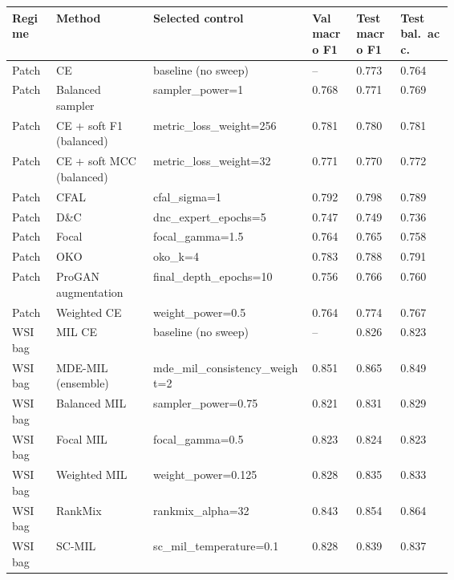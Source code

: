 \begin{tabularx}{\linewidth}{@{}>{\raggedright\arraybackslash}p{0.10\linewidth}>{\raggedright\arraybackslash}p{0.22\linewidth}>{\raggedright\arraybackslash}X>{\centering\arraybackslash}p{0.10\linewidth}>{\centering\arraybackslash}p{0.10\linewidth}>{\centering\arraybackslash}p{0.12\linewidth}@{}}
\toprule
Regime & Method & Selected control & Val macro F1 & Test macro F1 & Test bal.\ acc.\\
\midrule
Patch & CE & baseline (no sweep) & -- & \num{0.773} & \num{0.764}\\
Patch & Balanced sampler & sampler\_power=1 & \num{0.768} & \num{0.771} & \num{0.769}\\
Patch & CE + soft F1 (balanced) & metric\_loss\_weight=256 & \num{0.781} & \num{0.780} & \num{0.781}\\
Patch & CE + soft MCC (balanced) & metric\_loss\_weight=32 & \num{0.771} & \num{0.770} & \num{0.772}\\
Patch & CFAL & cfal\_sigma=1 & \num{0.792} & \num{0.798} & \num{0.789}\\
Patch & D\&C & dnc\_expert\_epochs=5 & \num{0.747} & \num{0.749} & \num{0.736}\\
Patch & Focal & focal\_gamma=1.5 & \num{0.764} & \num{0.765} & \num{0.758}\\
Patch & OKO & oko\_k=4 & \num{0.783} & \num{0.788} & \num{0.791}\\
Patch & ProGAN augmentation & final\_depth\_epochs=10 & \num{0.756} & \num{0.766} & \num{0.760}\\
Patch & Weighted CE & weight\_power=0.5 & \num{0.764} & \num{0.774} & \num{0.767}\\
WSI bag & MIL CE & baseline (no sweep) & -- & \num{0.826} & \num{0.823}\\
WSI bag & MDE-MIL (ensemble) & mde\_mil\_consistency\_weight=2 & \num{0.851} & \num{0.865} & \num{0.849}\\
WSI bag & Balanced MIL & sampler\_power=0.75 & \num{0.821} & \num{0.831} & \num{0.829}\\
WSI bag & Focal MIL & focal\_gamma=0.5 & \num{0.823} & \num{0.824} & \num{0.823}\\
WSI bag & Weighted MIL & weight\_power=0.125 & \num{0.828} & \num{0.835} & \num{0.833}\\
WSI bag & RankMix & rankmix\_alpha=32 & \num{0.843} & \num{0.854} & \num{0.864}\\
WSI bag & SC-MIL & sc\_mil\_temperature=0.1 & \num{0.828} & \num{0.839} & \num{0.837}\\
\bottomrule
\end{tabularx}
